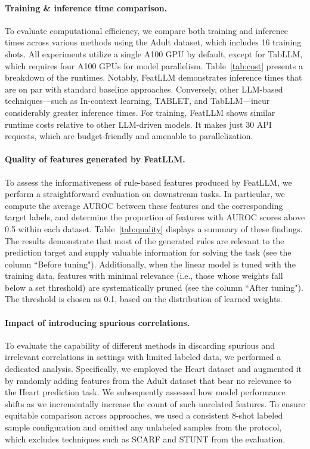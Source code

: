 \vspace*{-0.12in}
\paragraph{Training \& inference time comparison.} To evaluate computational efficiency, we compare both training and inference times across various methods using the Adult dataset, which includes 16 training shots. All experiments utilize a single A100 GPU by default, except for TabLLM, which requires four A100 GPUs for model parallelism. Table~\ref{tab:cost} presents a breakdown of the runtimes. Notably, \textsf{FeatLLM} demonstrates inference times that are on par with standard baseline approaches. Conversely, other LLM-based techniques—such as In-context learning, TABLET, and TabLLM—incur considerably greater inference times. For training, \textsf{FeatLLM} shows similar runtime costs relative to other LLM-driven models. It makes just 30 API requests, which are budget-friendly and amenable to parallelization.

\vspace*{-0.12in}
\paragraph{Quality of features generated by \textsf{FeatLLM}.}
To assess the informativeness of rule-based features produced by \textsf{FeatLLM}, we perform a straightforward evaluation on downstream tasks. In particular, we compute the average AUROC between these features and the corresponding target labels, and determine the proportion of features with AUROC scores above 0.5 within each dataset. 
Table~\ref{tab:quality} displays a summary of these findings. The results demonstrate that most of the generated rules are relevant to the prediction target and supply valuable information for solving the task (see the column ``Before tuning"). Additionally, when the linear model is tuned with the training data, features with minimal relevance (i.e., those whose weights fall below a set threshold) are systematically pruned (see the column ``After tuning"). The threshold is chosen as 0.1, based on the distribution of learned weights.

\vspace*{-0.12in}
\paragraph{Impact of introducing spurious correlations.} To evaluate the capability of different methods in discarding spurious and irrelevant correlations in settings with limited labeled data, we performed a dedicated analysis. Specifically, we employed the Heart dataset and augmented it by randomly adding features from the Adult dataset that bear no relevance to the Heart prediction task. We subsequently assessed how model performance shifts as we incrementally increase the count of such unrelated features. To ensure equitable comparison across approaches, we used a consistent 8-shot labeled sample configuration and omitted any unlabeled samples from the protocol, which excludes techniques such as SCARF and STUNT from the evaluation.

